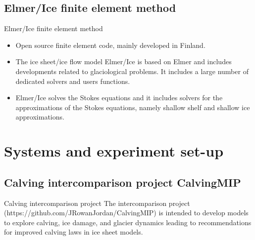 \documentclass[11pt]{beamer}
\begin{document}
	\subsection{Elmer/Ice finite element method}
	\begin{frame}{Elmer/Ice finite element method}
		\justifying
		\begin{itemize}
			\item Open source finite element code, mainly developed in Finland.
			\item The ice sheet/ice flow model Elmer/Ice is based on Elmer and includes developments related to glaciological problems. It includes a large number of dedicated solvers and users functions.
			\item Elmer/Ice solves the Stokes equations and it includes solvers for the approximations of the Stokes equations, namely shallow shelf and shallow ice approximations.
		\end{itemize}
	\end{frame}
	\section{Systems and experiment set-up}
	\subsection{Calving intercomparison project CalvingMIP}
	\begin{frame}{Calving intercomparison project}
		\justifying
		The intercomparison project (https://github.com/JRowanJordan/CalvingMIP) is intended to develop models to explore calving, ice damage, and glacier dynamics leading to recommendations for improved calving laws in ice sheet models.
		
	\end{frame}
\end{document}
